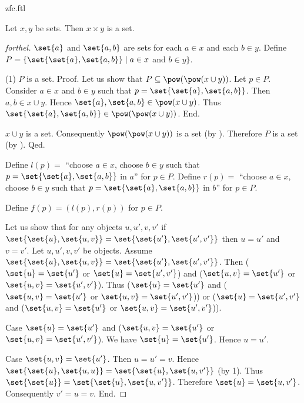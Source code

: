 \documentclass{naproche-library}
\begin{document}
\begin{smodule}[title=ZFC]{zfc.ftl}
\begin{proposition}[forthel,id=FOUNDATIONS_10_4458706448154624]
  Let $x, y$ be sets.
  Then $x \times y$ is a set.
\end{proposition}
\begin{proof}[forthel]
  $\set{a}$ and $\set{a,b}$ are sets for each $a \in x$ and each $b \in y$.
  Define $P = \{ \set{\set{a}, \set{a,b}} \mid a \in x$ and $b \in y \}$.

  (1) $P$ is a set. \newline
  Proof.
    Let us show that $P \subseteq \pow(\pow(x \cup y))$.
      Let $p \in P$.
      Consider $a \in x$ and $b \in y$ such that $p = \set{\set{a},\set{a,b}}$.
      Then $a, b \in x \cup y$.
      Hence $\set{a}, \set{a,b} \in \pow(x \cup y)$.
      Thus $\set{\set{a}, \set{a,b}} \in \pow(\pow(x \cup y))$.
    End.

    $x \cup y$ is a set.
    Consequently $\pow(\pow(x \cup y))$ is a set (by ).
    Therefore $P$ is a set (by ).
  Qed.

  Define $l(p) =$ ``choose $a \in x$, choose $b \in y$ such that $p = \set{\set{a}, \set{a,b}}$ in $a$'' for $p \in P$.
  Define $r(p) =$ ``choose $a \in x$, choose $b \in y$ such that $p = \set{\set{a}, \set{a,b}}$ in $b$'' for $p \in P$.

  Define $f(p) = (l(p), r(p))$ for $p \in P$.

  Let us show that for any objects $u, u', v, v'$ if
  $\set{\set{u}, \set{u,v}} = \set{\set{u'}, \set{u',v'}}$ then $u = u'$ and $v = v'$.
    Let $u, u', v, v'$ be objects.
    Assume $\set{\set{u}, \set{u,v}} = \set{\set{u'}, \set{u',v'}}$.
    Then ($\set{u} = \set{u'}$ or $\set{u} = \set{u',v'}$) and ($\set{u,v} = \set{u'}$ or $\set{u,v} = \set{u',v'}$).
    Thus ($\set{u} = \set{u'}$ and ($\set{u,v} = \set{u'}$ or $\set{u,v} = \set{u',v'}$)) or ($\set{u} = \set{u',v'}$ and ($\set{u,v} = \set{u'}$ or $\set{u,v} = \set{u',v'}$)).

    Case $\set{u} = \set{u'}$ and ($\set{u,v} = \set{u'}$ or $\set{u,v} = \set{u',v'}$).
      We have $\set{u} = \set{u'}$.
      Hence $u = u'$.

      Case $\set{u,v} = \set{u'}$.
        Then $u = u'= v$.
        Hence $\set{\set{u}, \set{u,u}} = \set{\set{u}, \set{u,v'}}$ (by 1).
        Thus $\set{\set{u}} = \set{\set{u}, \set{u,v'}}$.
        Therefore $\set{u} = \set{u,v'}$.
        Consequently $v' = u = v$.
      End.


\end{proof}
\end{smodule}
\end{document}
